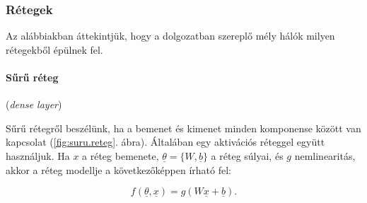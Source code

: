 

\subsubsection{Rétegek}



Az alábbiakban áttekintjük, hogy a dolgozatban szereplő mély hálók milyen rétegekből épülnek fel.


\paragraph{Sűrű réteg} (\textit{dense layer}) 


Sűrű rétegről beszélünk, ha a bemenet és kimenet minden komponense között van kapcsolat (\ref{fig:suru.reteg}. ábra). Általában egy aktivációs réteggel együtt használjuk. Ha $ x $ a réteg bemenete, $ \underline{\theta} = \{W, \underline{b}\} $ a réteg súlyai, és $ g $ nemlinearitás, akkor a réteg modellje a következőképpen írható fel:

\[  
f(\underline{\theta}, \underline{x}) = g(W \underline{x} + \underline{b}) .
\]


